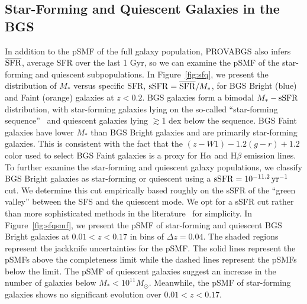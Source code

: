 \subsection{Star-Forming and Quiescent Galaxies in the BGS} \label{sec:sfq}
In addition to the pSMF of the full galaxy population, PROVABGS also infers
$\overline{\rm SFR}$, average SFR over the last 1 Gyr, so we can examine the
pSMF of the star-forming and quiescent subpopulations. 
In Figure~\ref{fig:sfq}, we present the distribution of $M_*$ versus specific
SFR, ${\rm sSFR} = \overline{\rm SFR}/M_*$, for BGS Bright (blue) and Faint
(orange) galaxies at $z < 0.2$. 
BGS galaxies form a bimodal $M_*-{\rm sSFR}$ distribution, with star-forming
galaxies lying on the so-called ``star-forming
sequence''~\citep[SFS;][]{noeske2007, daddi2007, salim2007, speagle2014,
hahn2019} and quiescent galaxies lying $\gtrsim$1 dex below the sequence. 
BGS Faint galaxies have lower $M_*$ than BGS Bright galaxies and are primarily
star-forming galaxies. 
This is consistent with the fact that the $(z - W1)-1.2(g-r)+1.2$ color used to
select BGS Faint galaxies is a proxy for H$\alpha$ and H$\beta$ emission lines.  
To further examine the star-forming and quiescent galaxy populations, we
classify BGS Bright galaxies as star-forming or quiescent using a 
${\rm sSFR} = 10^{-11.2}\,{\rm yr}^{-1}$ cut. 
We determine this cut empirically based roughly on the sSFR of the ``green
valley'' between the SFS and the quiescent mode. 
We opt for a sSFR cut rather than more sophisticated methods in the
literature~\citep[\emph{e.g.}][]{hahn2019, donnari2019} for simplicity. 
In Figure~\ref{fig:sfqsmf}, we present the pSMF of star-forming and quiescent
BGS Bright galaxies at $0.01 < z < 0.17$ in bins of $\Delta z = 0.04$.
The shaded regions represent the jackknife uncertainties for the pSMF. 
The solid lines represent the pSMFs above the completeness limit while the
dashed lines represent the pSMFs below the limit. 
The pSMF of quiescent galaxies suggest an increase in the number of galaxies
below $M_* < 10^{11}M_\odot$.
Meanwhile, the pSMF of star-forming galaxies shows no significant evolution
over $0.01 < z < 0.17$. 

